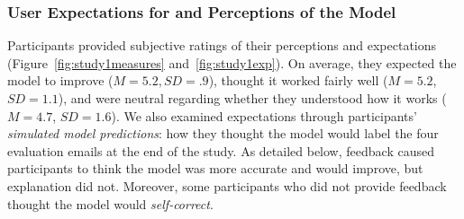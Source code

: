 \subsubsection{User Expectations for and Perceptions of the Model}
Participants provided subjective ratings of their perceptions and expectations (Figure~\ref{fig:study1measures} and~\ref{fig:study1exp}).
On average, they expected the model to improve ($M=5.2, SD=.9$), thought it worked fairly well ($M=5.2$, $SD=1.1$), and were neutral regarding whether they understood how it works ($M=4.7$, $SD=1.6$). 
%
We also examined expectations through participants' \textit{simulated model predictions}: how they thought the model would label the four evaluation emails at the end of the study. %
As detailed below, feedback caused participants to think the model was more accurate and would improve, but explanation did not. Moreover, some participants who did not provide feedback thought the model would \textit{self-correct}.


